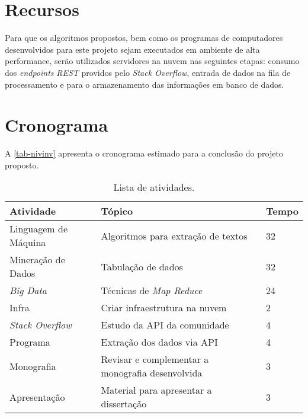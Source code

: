 \chapter{Recursos}
Para que os algoritmos propostos, bem como os programas de computadores desenvolvidos para este projeto sejam executados em ambiente de alta performance, serão utilizados servidores na nuvem nas seguintes etapas: consumo dos \textit{endpoints} \emph{REST} providos pelo \textit{Stack Overflow}, entrada de dados na fila de processamento e para o armazenamento das informações em banco de dados.

\chapter{Cronograma}

A \autoref{tab-nivinv} apresenta o cronograma estimado para a conclusão do projeto proposto.

\begin{table}[htb]
\ABNTEXfontereduzida
\caption[Cronograma]{Lista de atividades.}
\label{tab-nivinv}
\begin{tabular}{p{3.75cm}|p{9.0cm}|p{1.5cm}}
   \textbf{Atividade} & \textbf{Tópico}  & \textbf{Tempo}  \\
    \hline
    Linguagem de Máquina & Algoritmos para extração de textos & 32 \\
    \hline
    Mineração de Dados & Tabulação de dados & 32  \\
    \hline
    \textit{Big Data} & Técnicas de \textit{Map Reduce} & 24  \\
	\hline
    Infra & Criar infraestrutura na nuvem & 2  \\
    \hline
    \textit{Stack Overflow} & Estudo da API da comunidade & 4  \\
    \hline
    Programa & Extração dos dados via API & 4  \\    
    \hline
    Monografia & Revisar e complementar a monografia desenvolvida & 3  \\    
     \hline
    Apresentação & Material para apresentar a dissertação & 3  \\        
\end{tabular}
\end{table}





